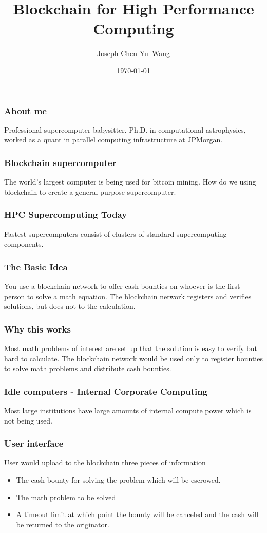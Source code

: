 \documentclass{beamer}
\title {Blockchain for High Performance Computing}
\author{Joseph Chen-Yu~Wang}
\institute{Bitquant Research Laboratories (Asia) Limited}
\date{\today}
\begin{document}
\frame{\titlepage}
\begin{frame}
  \frametitle{About me}
Professional supercomputer babysitter.  Ph.D. in computational
astrophysics, worked as a quant in parallel computing 
infrastructure at JPMorgan.
\end{frame}
\begin{frame}
  \frametitle{Blockchain supercomputer}
The world's largest computer is being used for bitcoin mining.  How do
we using blockchain to create a general purpose supercomputer.  
\end{frame}
\begin{frame}
  \frametitle{HPC Supercomputing Today}
  Fastest supercomputers consist of clusters of standard
  supercomputing components.
\end{frame}
\begin{frame}
  \frametitle{The Basic Idea}
  You use a blockchain network to offer cash bounties on whoever is
  the first person to solve a math equation.  The blockchain network
  registers and verifies solutions, but does not to the calculation.
\end{frame}
\begin{frame}
  \frametitle{Why this works}
Most math problems of interest are set up that the solution is easy to
verify but hard to calculate.  The blockchain network would be used
only to register bounties to solve math problems and distribute cash
bounties.
\end{frame}
\begin{frame}
  \frametitle{Idle computers - Internal Corporate Computing}
Most large institutions have large amounts of internal compute power
which is not being used.
\end{frame}
\begin{frame}
  \frametitle{User interface}
  User would upload to the blockchain three pieces of information
  \begin{itemize}
  \item The cash bounty for solving the problem which will be escrowed.
  \item The math problem to be solved
  \item A timeout limit at which point the bounty will be canceled
    and the cash will be returned to the originator.
  \end{itemize}
\end{frame}
\end{document}
